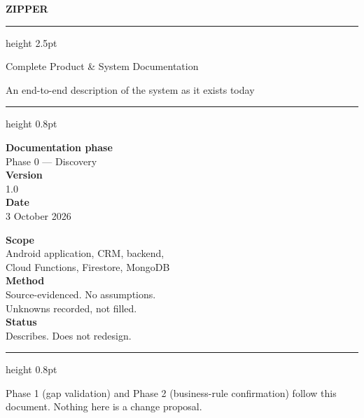 \begin{titlepage}
\thispagestyle{empty}
\begingroup
\color{zink}
\vspace*{26mm}
{\fontsize{56}{60}\selectfont\bfseries ZIPPER\par}
\vspace{5mm}
{\color{zrule}\hrule height 2.5pt}
\vspace{7mm}
{\fontsize{19}{24}\selectfont Complete Product \& System Documentation\par}
\vspace{3mm}
{\large\color{zgrey} An end-to-end description of the system as it exists today\par}
\vfill
{\color{zrule}\hrule height 0.8pt}
\vspace{5mm}
\begin{minipage}[t]{0.49\textwidth}
\footnotesize\color{zgrey}
\textbf{\color{zink}Documentation phase}\\[2pt]
Phase 0 — Discovery\\[9pt]
\textbf{\color{zink}Version}\\[2pt]
1.0\\[9pt]
\textbf{\color{zink}Date}\\[2pt]
3 October 2026
\end{minipage}%
\begin{minipage}[t]{0.49\textwidth}
\footnotesize\color{zgrey}
\textbf{\color{zink}Scope}\\[2pt]
Android application, CRM, backend,\\
Cloud Functions, Firestore, MongoDB\\[9pt]
\textbf{\color{zink}Method}\\[2pt]
Source-evidenced. No assumptions.\\
Unknowns recorded, not filled.\\[9pt]
\textbf{\color{zink}Status}\\[2pt]
Describes. Does not redesign.
\end{minipage}
\vspace{7mm}
{\color{zrule}\hrule height 0.8pt}
\vspace{4mm}
{\scriptsize\color{zgrey} Phase 1 (gap validation) and Phase 2 (business-rule confirmation) follow this document. Nothing here is a change proposal.\par}
\endgroup
\end{titlepage}
\newpage
